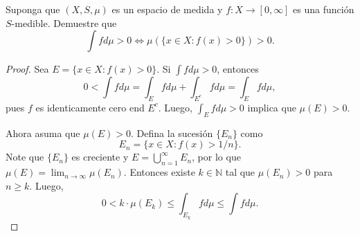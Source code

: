 \documentclass[12pt]{article}
\newcommand{\N}{\mathbb{N}}
\newenvironment{problem}[2][Problema]{\begin{trivlist}
\item[\hskip \labelsep {\bfseries #1}\hskip \labelsep {\bfseries #2.}]}{\end{trivlist}}
\begin{document}

\begin{problem}{15}
    Suponga que $(X, S, \mu)$ es un espacio de medida y $f: X \rightarrow [0, \infty]$ es una función $S$-medible. Demuestre que
    $$\int f d \mu > 0 \iff \mu \left( \{ x \in X: f(x) > 0 \} \right) > 0. $$
\end{problem}
\begin{proof}
    Sea $E = \{ x \in X: f(x) > 0 \}$.
    Si $\int f d \mu > 0$, entonces
    $$0 < \int f d \mu = \int_E f d \mu + \int_{E^c} f  d\mu = \int_E f d \mu, $$
    pues $f$ es identicamente cero end $E^c.$ Luego, $\int_E 
f d\mu > 0$ implica que $\mu(E) > 0.$

Ahora asuma que $\mu(E) > 0.$ Defina la sucesión $\{E_n\}$ como 
    $$E_n = \{x \in X: f(x) > 1 / n\}.$$
    Note que $\{E_n\}$ es creciente y $E = \bigcup_{n=1}^\infty E_n$, por lo que 
    $\mu(E) = \lim_{n \to \infty} \mu(E_n).$ Entonces existe $k \in \N$ tal que $\mu(E_n) > 0$ para $n \geq k$. Luego, 
$$0 < k \cdot \mu(E_k) \leq \int_{E_k} f d\mu \leq  \int f d\mu. $$
\end{proof}
\begin{comment}
    
\begin{proof}
    Sea $E = \{ x \in X: f(x) > 0 \}.$ Suponga que $\int f d \mu = 0$. Defina para toda $k \in \N$, la sucesión $E_k = \{ x\in X: f(x) > 1/k\}$. Defina, para toda $k$, la función simple 
    $$\varphi_k = \chi_{E_k} \inf_{E_k} f.$$
    Vea que $\int \varphi = \mu(E_k) \inf_{E_k} f \geq \mu(E_k) / k$ para toda $k\in N.$ Pero dado que $\int f d \mu = 0$ , entonces $ \mu(E_k) / k = 0$, y esto ocurre si y solo si $\mu(E_k) = 0$ para toda $k\in \N.$ Dado que $E = \bigcup_{k=1}^\infty E_k$, se tiene que $\mu(E) \leq \sum_{k=1}^\infty \mu(E_k) = 0.$

    Suponga que $\mu(E) = 0.$ Sea $\varphi = \sum_{i=1}^n a_i \chi_{A_i}$ una función simple tal que $\varphi \leq f.$ Note que $\varphi = \varphi ( \chi_E  + \chi_{E^c} ).$ Entonces 
    $$\int \varphi d \mu = \int \varphi \chi_E d \mu + \int \varphi \chi_{E^c} = \sum_{i=1}^n a_i \mu (A_i \cap E) + \sum_{i=1}^n a_i \mu(A_i \cap E^c).$$
    Puesto que $A_i \cap E \subset E,$, entonces $m(A_i \cap E) \leq m(E) = 0$, por lo que la primera sumatoria es cero. Por otro lado, puesto que $A_i \cap E^c \subset E^c$ y $\varphi \leq f$, entonces $a_i = 0$, por lo que la segunda sumatoria es cero. Así pues, $\int \varphi d \mu = 0$. Como $\varphi$ fue arbitraria, se tiene que $\int f d\mu = 0.$
\end{proof}
\end{comment}
\end{document}
